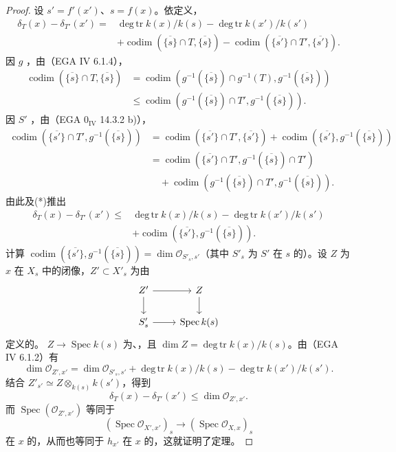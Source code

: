 \begin{proof}
设 $s'=f'(x')$、$s=f(x)$。依定义，
\[\begin{aligned}
\delta_T(x)-\delta_{T'}(x')={}&\operatorname{deg\,tr}k(x)/k(s)-\operatorname{deg\,tr}k(x')/k(s')\\
&+\operatorname{codim}(\overline{\{s\}}\cap T,\overline{\{s\}})-\operatorname{codim}(\overline{\{s'\}}\cap T',\overline{\{s'\}}).
\end{aligned}\]
因 $g$ ，由（EGA IV 6.1.4），
\[\begin{aligned}
\operatorname{codim}(\overline{\{s\}}\cap T,\overline{\{s\}})&=\operatorname{codim}(g^{-1}(\overline{\{s\}})\cap g^{-1}(T),g^{-1}(\overline{\{s\}}))\\
&\leq\operatorname{codim}(g^{-1}(\overline{\{s\}})\cap T',g^{-1}(\overline{\{s\}})).
\end{aligned}\tag{*}\]
因 $S'$ ，由（EGA $0_{\mathrm{IV}}$ 14.3.2 b)），
\[\begin{aligned}
\operatorname{codim}(\overline{\{s'\}}\cap T',g^{-1}(\overline{\{s\}}))
&=\operatorname{codim}(\overline{\{s'\}}\cap T',\overline{\{s'\}})+\operatorname{codim}(\overline{\{s'\}},g^{-1}(\overline{\{s\}}))\\
&=\operatorname{codim}(\overline{\{s'\}}\cap T',g^{-1}(\overline{\{s\}})\cap T')\\
&\quad+\operatorname{codim}(g^{-1}(\overline{\{s\}})\cap T',g^{-1}(\overline{\{s\}})).
\end{aligned}\]
由此及(*)推出
\[\begin{aligned}
\delta_T(x)-\delta_{T'}(x')\leq{}&\operatorname{deg\,tr}k(x)/k(s)-\operatorname{deg\,tr}k(x')/k(s')\\
&+\operatorname{codim}(\overline{\{s'\}},g^{-1}(\overline{\{s\}})).
\end{aligned}\]
计算 $\operatorname{codim}(\overline{\{s'\}},g^{-1}(\overline{\{s\}}))=\dim\mathcal O_{S'_s,s'}$（其中 $S'_s$ 为 $S'$ 在 $s$ 的）。设 $Z$ 为 $x$ 在 $X_s$ 中的闭像，$Z'\subset X'_s$ 为由
\[\begin{tikzcd}Z'\arrow[r]\arrow[d]&Z\arrow[d]\\S'_s\arrow[r]&\operatorname{Spec}k(s)\end{tikzcd}\]
定义的。 $Z\to\operatorname{Spec}k(s)$ 为、，且 $\dim Z=\operatorname{deg\,tr}k(x)/k(s)$。由（EGA IV 6.1.2）有
\[\dim\mathcal O_{Z',x'}=\dim\mathcal O_{S'_s,s'}+\operatorname{deg\,tr}k(x)/k(s)-\operatorname{deg\,tr}k(x')/k(s').\]
结合 $Z'_{s'}\simeq Z\otimes_{k(s)}k(s')$，得到
\[\delta_T(x)-\delta_{T'}(x')\leq\dim\mathcal O_{Z',x'}.\]
而 $\operatorname{Spec}(\mathcal O_{Z',x'})$ 等同于
\[(\operatorname{Spec}\mathcal O_{X',x'})_s\longrightarrow(\operatorname{Spec}\mathcal O_{X,x})_s\]
在 $x$ 的，从而也等同于 $h_{x'}$ 在 $x$ 的，这就证明了定理。
\end{proof}
